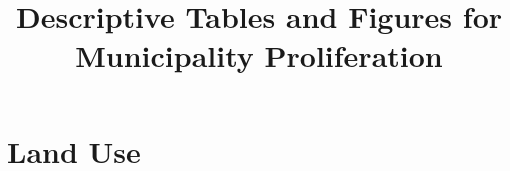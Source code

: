 \documentclass{article}
\title{Descriptive Tables and Figures for Municipality Proliferation}
\begin{document}
\maketitle
\tableofcontents
{\footnotesize 
\listoffigures
\listoftables}
\clearpage

\section{Land Use}

\clearpage

\clearpage

\clearpage

\clearpage

\clearpage

\clearpage


\clearpage

\clearpage

\clearpage

\clearpage
\end{document}
